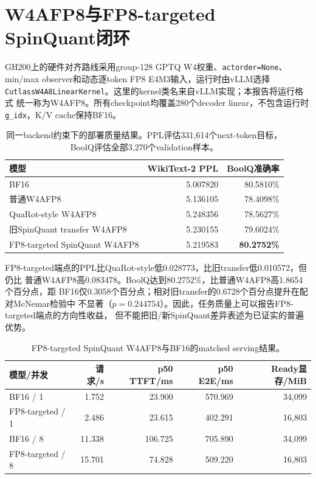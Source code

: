 \documentclass[11pt,a4paper]{ctexart}
\begin{document}
\section{W4AFP8与FP8-targeted SpinQuant闭环}

GH200上的硬件对齐路线采用group-128 GPTQ W4权重、\texttt{actorder=None}、
min/max observer和动态逐token FP8 E4M3输入，运行时由vLLM选择
\texttt{CutlassW4A8LinearKernel}。这里的kernel类名来自vLLM实现；本报告将运行格式
统一称为W4AFP8。所有checkpoint均覆盖280个decoder linear，不包含运行时
\texttt{g\_idx}，K/V cache保持BF16。

\begin{table}[htbp]
  \centering
  \small
  \begin{tabular}{@{}lrr@{}}
    \toprule
    模型 & WikiText-2 PPL & BoolQ准确率 \\
    \midrule
    BF16 & 5.007820 & 80.5810\% \\
    普通W4AFP8 & 5.136105 & 78.4098\% \\
    QuaRot-style W4AFP8 & 5.248356 & 78.5627\% \\
    旧SpinQuant transfer W4AFP8 & 5.230155 & 79.6024\% \\
    FP8-targeted SpinQuant W4AFP8 & 5.219583 & \textbf{80.2752\%} \\
    \bottomrule
  \end{tabular}
  \caption{同一backend约束下的部署质量结果。PPL评估331,614个next-token目标，
  BoolQ评估全部3,270个validation样本。}
\end{table}

FP8-targeted端点的PPL比QuaRot-style低0.028773，比旧transfer低0.010572，但仍比
普通W4AFP8高0.083478。BoolQ达到80.2752\%，比普通W4AFP8高1.8654个百分点，距
BF16仅0.3058个百分点；相对旧transfer的0.6728个百分点提升在配对McNemar检验中
不显著（$p=0.244754$）。因此，任务质量上可以报告FP8-targeted端点的方向性收益，
但不能把旧/新SpinQuant差异表述为已证实的普遍优势。

\begin{table}[htbp]
  \centering
  \small
  \begin{tabular}{@{}lrrrr@{}}
    \toprule
    模型/并发 & 请求/s & p50 TTFT/ms & p50 E2E/ms & Ready显存/MiB \\
    \midrule
    BF16 / 1 & 1.752 & 23.900 & 570.969 & 34,099 \\
    FP8-targeted / 1 & 2.486 & 23.615 & 402.291 & 16,803 \\
    BF16 / 8 & 11.338 & 106.725 & 705.890 & 34,099 \\
    FP8-targeted / 8 & 15.701 & 74.828 & 509.220 & 16,803 \\
    \bottomrule
  \end{tabular}
  \caption{FP8-targeted SpinQuant W4AFP8与BF16的matched serving结果。}
\end{table}
\end{document}

